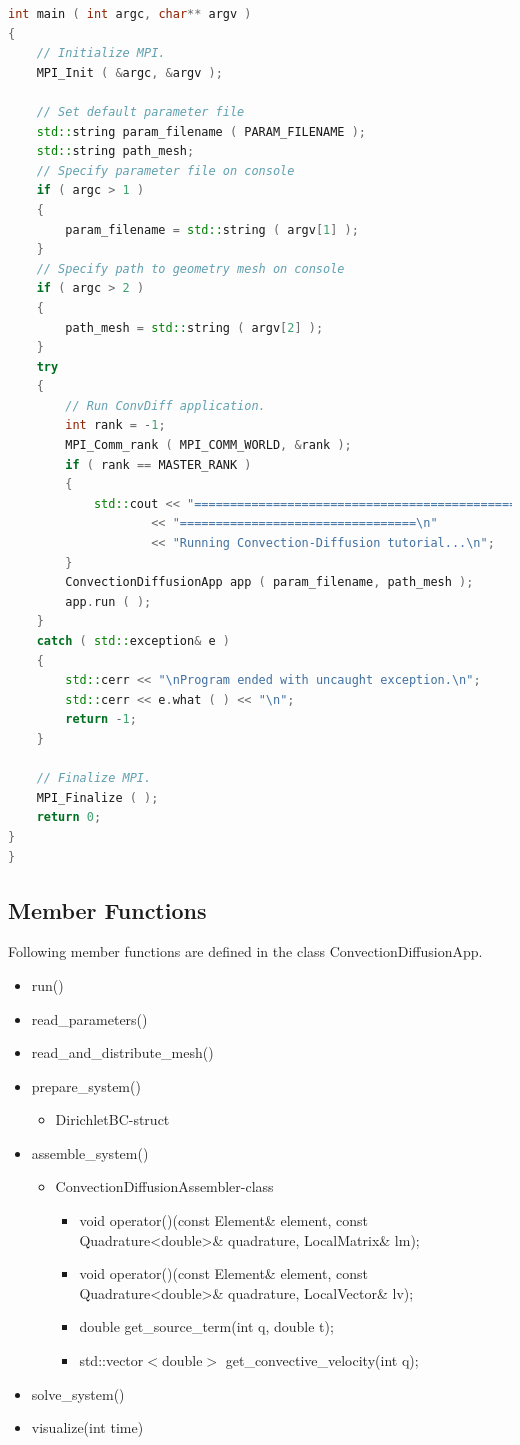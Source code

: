 \documentclass[a4paper, 11pt, twoside]{article}
\begin{document}
\begin{lstlisting}[language=C++, basicstyle={\footnotesize, \ttfamily}, keywordstyle=\color{blue},  numbers=none, tabsize=4]
int main ( int argc, char** argv )
{
    // Initialize MPI.
    MPI_Init ( &argc, &argv );

    // Set default parameter file
    std::string param_filename ( PARAM_FILENAME );
    std::string path_mesh;
    // Specify parameter file on console
    if ( argc > 1 )
    {
        param_filename = std::string ( argv[1] );
    }
    // Specify path to geometry mesh on console
    if ( argc > 2 )
    {
        path_mesh = std::string ( argv[2] );
    }
    try
    {
        // Run ConvDiff application.
        int rank = -1;
        MPI_Comm_rank ( MPI_COMM_WORLD, &rank );
        if ( rank == MASTER_RANK )
        {
            std::cout << "==============================================="
                    << "=================================\n"
                    << "Running Convection-Diffusion tutorial...\n";
        }
        ConvectionDiffusionApp app ( param_filename, path_mesh );
        app.run ( );
    }
    catch ( std::exception& e )
    {
        std::cerr << "\nProgram ended with uncaught exception.\n";
        std::cerr << e.what ( ) << "\n";
        return -1;
    }

    // Finalize MPI.
    MPI_Finalize ( );
    return 0;
}
}
\end{lstlisting}

\subsection{Member Functions}
Following member functions are defined in the class ConvectionDiffusionApp.
\begin{itemize}
 \item run()
 \item read\_parameters()
 \item read\_and\_distribute\_mesh()
 \item prepare\_system()
 \begin{itemize}
 \item DirichletBC-struct
 \end{itemize}
 \item assemble\_system()
 \begin{itemize}
 \item ConvectionDiffusionAssembler-class
 \begin{itemize}
 \item void operator()(const Element\& element, const Quadrature\textless double\textgreater \& quadrature, LocalMatrix\& lm);
 \item void operator()(const Element\& element, const Quadrature\textless double\textgreater \& quadrature, LocalVector\& lv);
 \item double get\_source\_term(int q, double t);
 \item std::vector$<$double$>$ get\_convective\_velocity(int q);
 \end{itemize}
 \end{itemize}
 \item solve\_system()
 \item visualize(int time)
\end{itemize}
\end{document}
